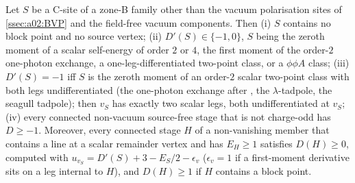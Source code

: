 \begin{theorem}\label{thm:a02:CEN}
Let $S$ be a C-site of a zone-B family other than the vacuum polarisation sites of \cref{ssec:a02:BVP} and the field-free vacuum components. Then (i) $S$ contains no block point and no source vertex; (ii) $D'(S)\in\{-1,0\}$, $S$ being the zeroth moment of a scalar self-energy of order $2$ or $4$, the first moment of the order-$2$ one-photon exchange, a one-leg-differentiated two-point class, or a $\phi\phi A$ class; (iii) $D'(S)=-1$ iff $S$ is the zeroth moment of an order-$2$ scalar two-point class with both legs undifferentiated (the one-photon exchange after \cite[(3.16)]{K2}, the $\lambda$-tadpole, the seagull tadpole); then $v_S$ has exactly two scalar legs, both undifferentiated at $v_S$; (iv) every connected non-vacuum source-free stage that is not charge-odd has $D\ge-1$. Moreover, every connected stage $H$ of a non-vanishing member that contains a line at a scalar remainder vertex and has $E_H\ge1$ satisfies $D(H)\ge0$, computed with $u_{v_S}=D'(S)+3-E_S/2-\epsilon_v$ ($\epsilon_v=1$ if a first-moment derivative sits on a leg internal to $H$), and $D(H)\ge1$ if $H$ contains a block point.
\end{theorem}
